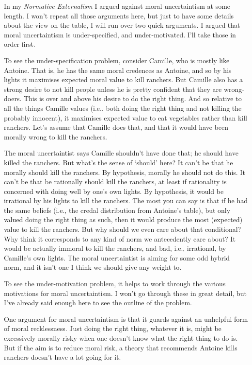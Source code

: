 \documentclass[11pt,]{book}
\begin{document}
In my \emph{Normative Externalism} \citeyearpar{Weatherson2019} I argued against moral uncertaintism at some length. I won't repeat all those arguments here, but just to have some details about the view on the table, I will run over two quick arguments. I argued that moral uncertaintism is under-specified, and under-motivated. I'll take those in order first.

To see the under-specification problem, consider Camille, who is mostly like Antoine. That is, he has the same moral credences as Antoine, and so by his lights it maximises expected moral value to kill ranchers. But Camille also has a strong desire to not kill people unless he is pretty confident that they are wrong-doers. This is over and above his desire to do the right thing. And so relative to all the things Camille values (i.e., both doing the right thing and not killing the probably innocent), it maximises expected value to eat vegetables rather than kill ranchers. Let's assume that Camille does that, and that it would have been morally wrong to kill the ranchers.

The moral uncertaintist says Camille shouldn't have done that; he should have killed the ranchers. But what's the sense of `should' here? It can't be that he morally should kill the ranchers. By hypothesis, morally he should not do this. It can't be that be rationally should kill the ranchers, at least if rationality is concerned with doing well by one's own lights. By hypothesis, it would be irrational by his lights to kill the ranchers. The most you can say is that if he had the same beliefs (i.e., the credal distribution from Antoine's table), but only valued doing the right thing as such, then it would produce the most (expected) value to kill the ranchers. But why should we even care about that conditional? Why think it corresponds to any kind of norm we antecedently care about? It would be actually immoral to kill the ranchers, and bad, i.e., irrational, by Camille's own lights. The moral uncertaintist is aiming for some odd hybrid norm, and it isn't one I think we should give any weight to.

To see the under-motivation problem, it helps to work through the various motivations for moral uncertaintism. I won't go through these in great detail, but I've already said enough here to see the outline of the problem.

One argument for moral uncertaintism is that it guards against an unhelpful form of moral recklessness. Just doing the right thing, whatever it is, might be excessively morally risky when one doesn't know what the right thing to do is. But if the aim is to reduce moral risk, a theory that recommends Antoine kills ranchers doesn't have a lot going for it.
\end{document}
